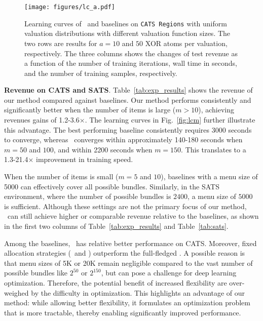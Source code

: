 \begin{figure}
    \centering
    \texttt{[image: figures/lc\_a.pdf]}
    \caption{Learning curves of \name~and baselines on \texttt{CATS Regions} with uniform valuation distributions with different valuation function sizes. The two rows are results for $a=10$ and $50$ XOR atoms per valuation, respectively. The three columns shows the changes of test revenue as a function of the number of training iterations, wall time in seconds, and the number of training samples, respectively.
    \label{fig:lca}}
\end{figure}

\textbf{Revenue on CATS and SATS}. Table~\ref{tab:exp_results} shows the revenue of our method compared against baselines. Our method performs consistently and significantly better when the number of items is large ($m>10$), achieving revenues gains of 1.2-3.6$\times$. The learning curves in Fig.~\ref{fig:lcm} further illustrate this advantage. The best performing baseline consistently requires 3000 seconds to converge, whereas \name~converges within approximately 140-180 seconds when $m=50$ and $100$, and within 2200 seconds when $m=150$. This translates to a 1.3-21.4$\times$ improvement in training speed.

When the number of items is small ($m=5$ and $10$), baselines with a menu size of 5000 can effectively cover all possible bundles. Similarly, in the SATS environment, where the number of possible bundles is $2400$, a menu size of $5000$ is sufficient. Although these settings are not the primary focus of our method, \name~can still achieve higher or comparable revenue relative to the baselines, as shown in the first two columns of Table~\ref{tab:exp_results} and Table~\ref{tab:sats}.

Among the baselines, \grandbundle~has relative better performance on CATS. Moreover, fixed allocation strategies (\smallbundle~and \bigbundle) outperform the full-fledged \bundle. A possible reason is that menu sizes of 5K or 20K remain negligible compared to the vast number of possible bundles like $2^{50}$ or $2^{150}$, but can pose a challenge for deep learning optimization. Therefore, the potential benefit of increased flexibility are over-weighed by the difficulty in optimization. This highlights an advantage of our method: while allowing better flexibility, it formulates an optimization problem that is more tractable, thereby enabling significantly improved performance.

